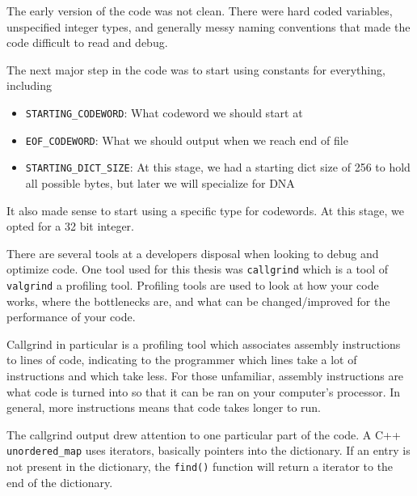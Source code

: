\documentclass[12pt,twoside]{reedthesis}
\providecommand{\tightlist}{%
  \setlength{\itemsep}{0pt}\setlength{\parskip}{0pt}}
\begin{document}
The early version of the code was not clean. There were hard coded variables, unspecified integer types, and generally messy naming conventions that made the code difficult to read and debug.

The next major step in the code was to start using constants for everything, including
\begin{itemize}
\tightlist
\item
  \texttt{STARTING\_CODEWORD}: What codeword we should start at
\item
  \texttt{EOF\_CODEWORD}: What we should output when we reach end of file
\item
  \texttt{STARTING\_DICT\_SIZE}: At this stage, we had a starting dict size of 256 to hold all possible bytes, but later we will specialize for DNA
\end{itemize}
It also made sense to start using a specific type for codewords. At this stage, we opted for a 32 bit integer.

There are several tools at a developers disposal when looking to debug and optimize code. One tool used for this thesis was \texttt{callgrind} which is a tool of \texttt{valgrind} a profiling tool. Profiling tools are used to look at how your code works, where the bottlenecks are, and what can be changed/improved for the performance of your code.

Callgrind in particular is a profiling tool which associates assembly instructions to lines of code, indicating to the programmer which lines take a lot of instructions and which take less. For those unfamiliar, assembly instructions are what code is turned into so that it can be ran on your computer's processor. In general, more instructions means that code takes longer to run.

The callgrind output drew attention to one particular part of the code. A C++ \texttt{unordered\_map} uses iterators, basically pointers into the dictionary. If an entry is not present in the dictionary, the \texttt{find()} function will return a iterator to the end of the dictionary.
\end{document}

